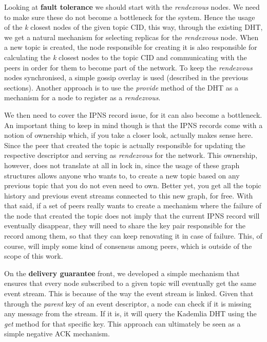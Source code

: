 Looking at \textbf{fault tolerance} we should start with the
\emph{rendezvous} nodes. We need to make sure these do not become a
bottleneck for the system. Hence the usage of the \emph{k} closest nodes
of the given topic CID, this way, through the existing DHT, we get a
natural mechanism for selecting replicas for the \emph{rendezvous} node.
When a new topic is created, the node responsible for creating it is
also responsible for calculating the \emph{k} closest nodes to the topic
CID and communicating with the peers in order for them to become part of
the network. To keep the \emph{rendezvous} nodes synchronised, a simple
gossip overlay is used (described in the previous sections). Another
approach is to use the \emph{provide} method of the DHT as a mechanism
for a node to register as a \emph{rendezvous}.

We then need to cover the IPNS record issue, for it can also become a
bottleneck. An important thing to keep in mind though is that the IPNS
records come with a notion of ownership which, if you take a closer
look, actually makes sense here. Since the peer that created the topic is
actually responsible for updating the respective descriptor and serving
as \emph{rendezvous} for the network. This ownership, however, does not
translate at all in lock in, since the usage of these graph structures
allows anyone who wants to, to create a new topic based on any previous
topic that you do not even need to own. Better yet, you get all the
topic history and previous event streams connected to this new graph,
for free. With that said, if a set of peers really wants to create a
mechanism where the failure of the node that created the topic does not
imply that the current IPNS record will eventually disappear, they will
need to share the key pair responsible for the record among them, so
that they can keep renovating it in case of failure. This, of course, will
imply some kind of consensus among peers, which is outside of the
scope of this work.

On the \textbf{delivery guarantee} front, we developed a simple mechanism
that ensures that every node subscribed to a given topic will eventually
get the same event stream. This is
because of the way the event stream is linked. Given that through the
\emph{parent} key of an event descriptor, a node can check if it is
missing any message from the stream. If it is, it will query the
Kademlia DHT using the \emph{get} method for that specific key. This
approach can ultimately be seen as a simple negative
ACK mechanism.

